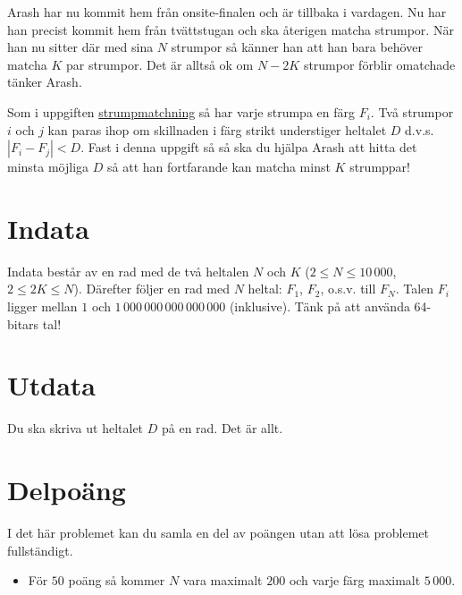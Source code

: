 
Arash har nu kommit hem från onsite-finalen och är tillbaka i
vardagen. Nu har han precist kommit hem från tvättstugan och ska
återigen matcha strumpor. När han nu sitter där med sina $N$ strumpor
så känner han att han bara behöver matcha $K$ par strumpor. Det
är alltså ok om $N-2K$ strumpor förblir omatchade tänker Arash. 

Som i uppgiften
\href{https://po.scrool.se/problems/strumpor}{strumpmatchning} så har
varje strumpa en färg $F_i$. Två strumpor $i$ och $j$ kan paras ihop
om skillnaden i färg strikt understiger heltalet $D$ d.v.s. $|F_{i} - F_{j}|<D$.
Fast i denna uppgift så så ska du hjälpa Arash att hitta det minsta
möjliga $D$ så att han fortfarande kan matcha minst $K$ strumppar!

\section*{Indata}

Indata består av en rad med de två heltalen $N$ och $K$ ($2 \le N \le 10\,000$, $2 \le 2K \le N$). Därefter följer en rad med $N$ heltal: $F_1$, $F_2$, o.s.v. till $F_N$. Talen $F_i$ ligger mellan $1$ och $1\,000\,000\,000\,000\,000$ (inklusive). Tänk på att använda 64-bitars tal!

\section*{Utdata}

Du ska skriva ut heltalet $D$ på en rad. Det är allt.

\section*{Delpoäng}

I det här problemet kan du samla en del av poängen utan att lösa
problemet fullständigt.

\begin{itemize}
    \item För $50$ poäng så kommer $N$ vara maximalt $200$ och varje färg maximalt $5\,000$.
\end{itemize}
